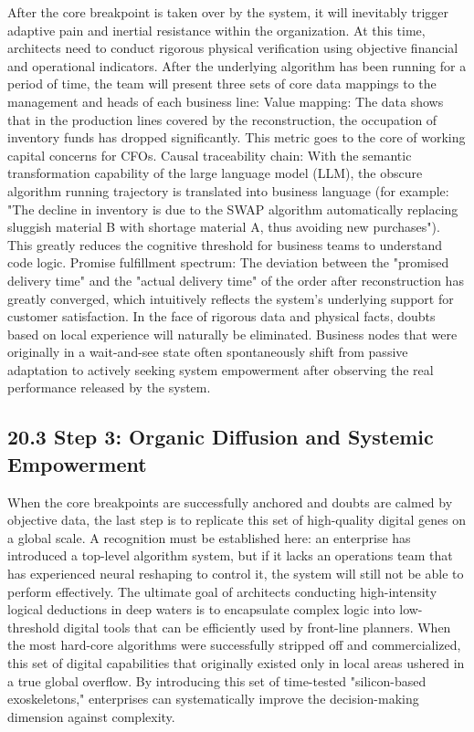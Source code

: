 \documentclass[11pt,a4paper]{article}
\begin{document}
After the core breakpoint is taken over by the system, it will inevitably trigger adaptive pain and inertial resistance within the organization. At this time, architects need to conduct rigorous physical verification using objective financial and operational indicators. After the underlying algorithm has been running for a period of time, the team will present three sets of core data mappings to the management and heads of each business line: Value mapping: The data shows that in the production lines covered by the reconstruction, the occupation of inventory funds has dropped significantly. This metric goes to the core of working capital concerns for CFOs. Causal traceability chain: With the semantic transformation capability of the large language model (LLM), the obscure algorithm running trajectory is translated into business language (for example: "The decline in inventory is due to the SWAP algorithm automatically replacing sluggish material B with shortage material A, thus avoiding new purchases"). This greatly reduces the cognitive threshold for business teams to understand code logic. Promise fulfillment spectrum: The deviation between the "promised delivery time" and the "actual delivery time" of the order after reconstruction has greatly converged, which intuitively reflects the system's underlying support for customer satisfaction. In the face of rigorous data and physical facts, doubts based on local experience will naturally be eliminated. Business nodes that were originally in a wait-and-see state often spontaneously shift from passive adaptation to actively seeking system empowerment after observing the real performance released by the system.


\subsection*{20.3 Step 3: Organic Diffusion and Systemic Empowerment}


When the core breakpoints are successfully anchored and doubts are calmed by objective data, the last step is to replicate this set of high-quality digital genes on a global scale. A recognition must be established here: an enterprise has introduced a top-level algorithm system, but if it lacks an operations team that has experienced neural reshaping to control it, the system will still not be able to perform effectively. The ultimate goal of architects conducting high-intensity logical deductions in deep waters is to encapsulate complex logic into low-threshold digital tools that can be efficiently used by front-line planners. When the most hard-core algorithms were successfully stripped off and commercialized, this set of digital capabilities that originally existed only in local areas ushered in a true global overflow. By introducing this set of time-tested "silicon-based exoskeletons," enterprises can systematically improve the decision-making dimension against complexity.
\end{document}
